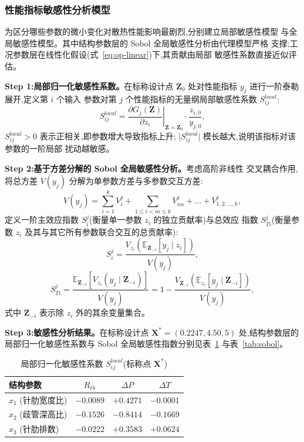 \subsubsection{性能指标敏感性分析模型}

为区分哪些参数的微小变化对散热性能影响最剧烈,分别建立局部敏感性模型
与全局敏感性模型。其中结构参数层的 Sobol 全局敏感性分析由代理模型严格
支撑;工况参数层在线性化假设(式~\eqref{eq:op-linear})下,其贡献由局部
敏感性系数直接近似评估。

\textbf{Step 1:局部归一化敏感性系数。}在标称设计点
$\mathbf{Z}_0$ 处对性能指标 $y_j$ 进行一阶泰勒展开,定义第 $i$ 个输入
参数对第 $j$ 个性能指标的无量纲局部敏感性系数 $S_{ij}^{local}$:
\begin{equation}
  S_{ij}^{local} = \left. \frac{\partial G_j(\mathbf{Z})}{\partial z_i}
  \right\vert_{\mathbf{Z}=\mathbf{Z}_0} \cdot \frac{z_{i,0}}{y_{j,0}},
  \label{eq:lsa}
\end{equation}
$S_{ij}^{local} > 0$ 表示正相关,即参数增大导致指标上升;
$\vert S_{ij}^{local} \vert$ 模长越大,说明该指标对该参数的一阶局部
扰动越敏感。

\textbf{Step 2:基于方差分解的 Sobol 全局敏感性分析。}考虑高阶非线性
交叉耦合作用,将总方差 $V(y_j)$ 分解为单参数方差与多参数交互方差:
\begin{equation}
  V(y_j) = \sum_{i=1}^{k} V_i^j + \sum_{1 \le i < m \le k} V_{im}^j
  + \dots + V_{1,2,\dots,k}^j,
  \label{eq:sobol-decomp}
\end{equation}
定义一阶主效应指数 $S_i^j$(衡量单一参数 $z_i$ 的独立贡献率)与总效应
指数 $S_{Ti}^j$(衡量参数 $z_i$ 及其与其它所有参数联合交互的总贡献率):
\begin{equation}
  S_i^j = \frac{V_{z_i}\left( \mathbb{E}_{\mathbf{Z}_{-i}}[y_j \mid z_i]
    \right)}{V(y_j)},
  \label{eq:sobol-first}
\end{equation}
\begin{equation}
  S_{Ti}^j = \frac{\mathbb{E}_{\mathbf{Z}_{-i}}\left[ V_{z_i}(y_j \mid
    \mathbf{Z}_{-i}) \right]}{V(y_j)} = 1 -
  \frac{V_{\mathbf{Z}_{-i}}\left( \mathbb{E}_{z_i}[y_j \mid
      \mathbf{Z}_{-i}] \right)}{V(y_j)},
  \label{eq:sobol-total}
\end{equation}
式中 $\mathbf{Z}_{-i}$ 表示除 $z_i$ 外的其余变量集合。

\textbf{Step 3:敏感性分析结果。}在标称设计点
$\mathbf{X}^*=(0.2247,4.50,5)$ 处,结构参数层的局部归一化敏感性系数与
Sobol 全局敏感性指数分别见表~\ref{tab:lsa} 与表~\ref{tab:sobol}。

\begin{table}[htbp]
  \centering
  \caption{局部归一化敏感性系数 $S_{ij}^{local}$(标称点 $\mathbf{X}^*$)}
  \label{tab:lsa}
  \begin{tabular}{lccc}
    \toprule
    结构参数          & $R_{th}$  & $\Delta P$ & $\Delta T$ \\
    \midrule
    $x_1$ (针肋宽度比) & $-0.0089$ & $+0.4271$  & $-0.0001$  \\
    $x_2$ (歧管深高比) & $-0.1526$ & $-0.8414$  & $-0.1669$  \\
    $x_3$ (针肋排数)  & $-0.0222$ & $+0.3583$  & $+0.0624$  \\
    \bottomrule
  \end{tabular}
\end{table}

